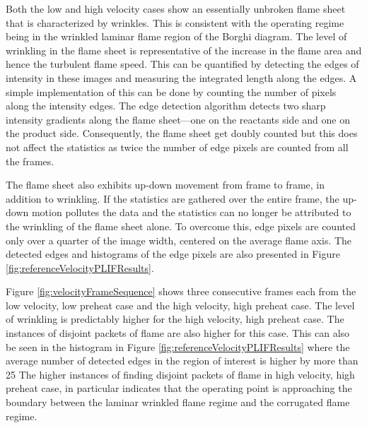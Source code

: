 

Both the low and high velocity cases show an essentially unbroken flame sheet that is characterized by wrinkles.
This is consistent with the operating regime being in the wrinkled laminar flame region of the Borghi diagram.
The level of wrinkling in the flame sheet is representative of the increase in the flame area and hence the turbulent flame speed.
This can be quantified by detecting the edges of intensity in these images and measuring the integrated length along the edges.
A simple implementation of this can be done by counting the number of pixels along the intensity edges.
The edge detection algorithm detects two sharp intensity gradients along the flame sheet---one on the reactants side and one on the product side.
Consequently, the flame sheet get doubly counted but this does not affect the statistics as twice the number of edge pixels are counted from all the frames.

The flame sheet also exhibits up-down movement from frame to frame, in addition to wrinkling.
If the statistics are gathered over the entire frame, the up-down motion pollutes the data and the statistics can no longer be attributed to the wrinkling of the flame sheet alone.
To overcome this, edge pixels are counted only over a quarter of the image width, centered on the average flame axis.
The detected edges and histograms of the edge pixels are also presented in Figure \ref{fig:referenceVelocityPLIFResults}.

Figure \ref{fig:velocityFrameSequence} shows three consecutive frames each from the low velocity, low preheat case and the high velocity, high preheat case.
The level of wrinkling is predictably higher for the high velocity, high preheat case.
The instances of disjoint packets of flame are also higher for this case.
This can also be seen in the histogram in Figure \ref{fig:referenceVelocityPLIFResults} where the average number of detected edges in the region of interest is higher by more than 25%
The higher instances of finding disjoint packets of flame in high velocity, high preheat case, in particular indicates that the operating point is approaching the boundary between the laminar wrinkled flame regime and the corrugated flame regime.




